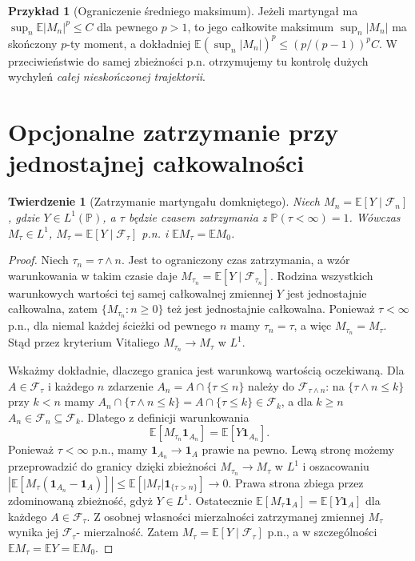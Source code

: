 \documentclass[11pt,a4paper,oneside]{report}
\numberwithin{equation}{chapter}
\theoremstyle{plain}
\newtheorem{twierdzenie}{Twierdzenie}[chapter]
\theoremstyle{definition}
\newtheorem{przyklad}{Przykład}[chapter]
\theoremstyle{remark}
\newcommand{\Prob}{\mathbb{P}}
\newcommand{\E}{\mathbb{E}}
\newcommand{\ind}[1]{\mathbf{1}_{#1}}
\begin{document}
\begin{przyklad}[Ograniczenie średniego maksimum]
Jeżeli martyngał ma $\sup_n\E|M_n|^p\leq C$
dla pewnego $p>1$, to jego całkowite
maksimum $\sup_n|M_n|$ ma skończony $p$-ty moment,
a dokładniej
$\E(\sup_n|M_n|)^p\leq(p/(p-1))^pC$.
W przeciwieństwie do samej zbieżności p.n.
otrzymujemy tu kontrolę dużych wychyleń
\emph{całej nieskończonej trajektorii}.
\end{przyklad}

\section{Opcjonalne zatrzymanie przy jednostajnej całkowalności}

\begin{twierdzenie}[Zatrzymanie martyngału domkniętego]
Niech $M_n=\E[Y\mid\mathcal F_n]$, gdzie
$Y\in L^1(\Prob)$, a $\tau$ będzie czasem
zatrzymania z $\Prob(\tau<\infty)=1$.
Wówczas $M_\tau\in L^1$,
$M_\tau=\E[Y\mid\mathcal F_\tau]$ p.n.
i $\E M_\tau=\E M_0$.
\end{twierdzenie}
\begin{proof}
Niech $\tau_n=\tau\wedge n$. Jest to ograniczony
czas zatrzymania, a wzór warunkowania w takim
czasie daje
$M_{\tau_n}=\E[Y\mid\mathcal F_{\tau_n}]$.
Rodzina wszystkich warunkowych wartości tej samej
całkowalnej zmiennej $Y$ jest jednostajnie
całkowalna, zatem $\{M_{\tau_n}:n\geq0\}$
też jest jednostajnie całkowalna.
Ponieważ $\tau<\infty$ p.n., dla niemal każdej
ścieżki od pewnego $n$ mamy $\tau_n=\tau$,
a więc $M_{\tau_n}=M_\tau$. Stąd przez kryterium
Vitaliego $M_{\tau_n}\to M_\tau$ w $L^1$.

Wskażmy dokładnie, dlaczego granica jest warunkową
wartością oczekiwaną. Dla $A\in\mathcal F_\tau$
i każdego $n$ zdarzenie
$A_n=A\cap\{\tau\leq n\}$ należy do
$\mathcal F_{\tau\wedge n}$:
na $\{\tau\wedge n\leq k\}$ przy $k<n$ mamy
$A_n\cap\{\tau\wedge n\leq k\}=A\cap\{\tau\leq k\}
\in\mathcal F_k$, a dla $k\geq n$
$A_n\in\mathcal F_n\subseteq\mathcal F_k$.
Dlatego z definicji warunkowania
\[
 \E[M_{\tau_n}\ind{A_n}]=\E[Y\ind{A_n}].
\]
Ponieważ $\tau<\infty$ p.n., mamy
$\ind{A_n}\to\ind A$ prawie na pewno.
Lewą stronę możemy przeprowadzić do granicy
dzięki zbieżności $M_{\tau_n}\to M_\tau$ w $L^1$
i oszacowaniu
$|\E[M_\tau(\ind{A_n}-\ind A)]|
\leq\E[|M_\tau|\ind{\{\tau>n\}}]\to0$.
Prawa strona zbiega przez zdominowaną zbieżność,
gdyż $Y\in L^1$. Ostatecznie
$\E[M_\tau\ind A]=\E[Y\ind A]$
dla każdego $A\in\mathcal F_\tau$.
Z osobnej własności mierzalności zatrzymanej
zmiennej $M_\tau$ wynika jej $\mathcal F_\tau$-
mierzalność. Zatem
$M_\tau=\E[Y\mid\mathcal F_\tau]$ p.n., a
w szczególności $\E M_\tau=\E Y=\E M_0$.
\end{proof}
\end{document}
